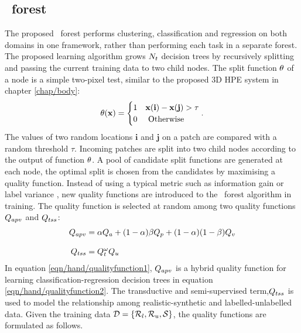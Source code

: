 \subsection{\STR\ forest} 
\label{sec/hand/strforest}
The proposed \STR\ forest performs clustering, classification and regression on both domains in one framework, rather than performing each task in a separate forest. 
The proposed learning algorithm grows $N_{t}$ decision trees by recursively splitting and passing the current training data to two child nodes. 
The split function $\theta$ of a node is a simple two-pixel test, similar to the proposed 3D HPE system in chapter \ref{chap/body}: 
\begin{equation}
	\theta(\mathbf{x}) = \begin{cases} 
		1 & \mathbf{x}(\textbf{i})-\mathbf{x}(\textbf{j}) > \tau \\
		0 & \mbox{ Otherwise } \\
	\end{cases}.
	\label{eqn/hand/pixeltest}
\end{equation}
The values of two random locations $\textbf{i}$ and $\textbf{j}$ on a patch are compared with a random threshold $\tau$. Incoming patches are split into two child nodes according to the output of function $\theta$. 
A pool of candidate split functions are generated at each node, the optimal split is chosen from the candidates by maximising a quality function.   
Instead of using a typical metric such as information gain \cite{Breiman2001} or label variance \cite{Shotton2013}, new quality functions are introduced to the \STR\ forest algorithm in training. The quality function is selected at random among two quality functions $Q_{apv}$ and $Q_{tss}$: 
\begin{align}
	\label{eqn/hand/qualityfunction1}
	Q_{apv} & = \alpha Q_{a} + (1 - \alpha)\beta Q_{p} + (1 - \alpha)(1 - \beta)Q_{v}  \\[3mm] 
	\label{eqn/hand/qualityfunction2}
	Q_{tss} & = Q_{t}^{\omega}Q_{u}
\end{align}
In equation \ref{eqn/hand/qualityfunction1}, $Q_{apv}$ is a hybrid quality function for learning classification-regression decision trees in equation \ref{eqn/hand/qualityfunction2}. The transductive and semi-supervised term,$Q_{tss}$ is used to model the relationship among realistic-synthetic and labelled-unlabelled data. Given the training data $\mathcal{D} = \{\mathcal{R}_{l}, \mathcal{R}_{u}, \mathcal{S}\}$, the quality functions are formulated as follows.   

